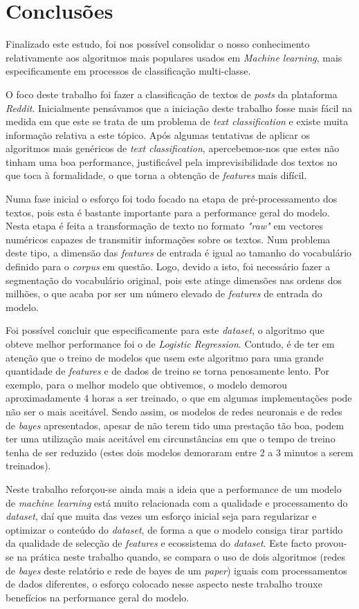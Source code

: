 \section{Conclusões}
Finalizado este estudo, foi nos possível consolidar o nosso conhecimento relativamente aos algoritmos mais populares usados em \textit{Machine learning}, mais especificamente em processos de classificação multi-classe. 

O foco deste trabalho foi fazer a classificação de textos de \textit{posts} da plataforma \textit{Reddit}. Inicialmente pensávamos que a iniciação deste trabalho fosse mais fácil na medida em que este se trata de um problema de \textit{text classification} e existe muita informação relativa a este tópico. Após algumas tentativas de aplicar os algoritmos mais genéricos de \textit{text classification}, apercebemos-nos que estes não tinham uma boa performance, justificável pela imprevisibilidade dos textos no que toca à formalidade, o que torna a obtenção de \textit{features} mais difícil.

Numa fase inicial o esforço foi todo focado na etapa de pré-processamento dos textos, pois esta é bastante importante para a performance geral do modelo. Nesta etapa é feita a transformação de texto no formato \textit{"raw"} em vectores numéricos capazes de transmitir informações sobre os textos. Num problema deste tipo, a dimensão das \textit{features} de entrada é igual ao tamanho do vocabulário definido para o \textit{corpus} em questão. Logo, devido a isto, foi necessário fazer a segmentação do vocabulário original, pois este atinge dimensões nas ordens dos milhões, o que acaba por ser um número elevado de \textit{features} de entrada do modelo.


Foi possível concluir que especificamente para este \textit{dataset}, o algoritmo que obteve melhor performance foi o de \textit{Logistic Regression}. Contudo, é de ter em atenção que o treino de modelos que usem este algoritmo para uma grande quantidade de \textit{features} e de dados de treino se torna penosamente lento. Por exemplo, para o melhor modelo que obtivemos, o modelo demorou aproximadamente 4 horas a ser treinado, o que em algumas implementações pode não ser o mais aceitável. Sendo assim, os modelos de redes neuronais e de redes de \textit{bayes} apresentados, apesar de não terem tido uma prestação tão boa, podem ter uma utilização mais aceitável em circunstâncias em que o tempo de treino tenha de ser reduzido (estes dois modelos demoraram entre 2 a 3 minutos a serem treinados).

Neste trabalho reforçou-se ainda mais a ideia que a performance de um modelo de \textit{machine learning} está muito relacionada com a qualidade e processamento do \textit{dataset}, daí que muita das vezes um esforço inicial seja para regularizar e optimizar o conteúdo do \textit{dataset}, de forma a que o modelo consiga tirar partido da qualidade de selecção de \textit{features} e ecossistema do \textit{dataset}. Este facto provou-se na prática neste trabalho quando, se compara o uso de dois algoritmos (redes de \textit{bayes} deste relatório e rede de bayes de um \textit{paper}) iguais com processamentos de dados diferentes, o esforço colocado nesse aspecto neste trabalho trouxe benefícios na performance geral do modelo.
